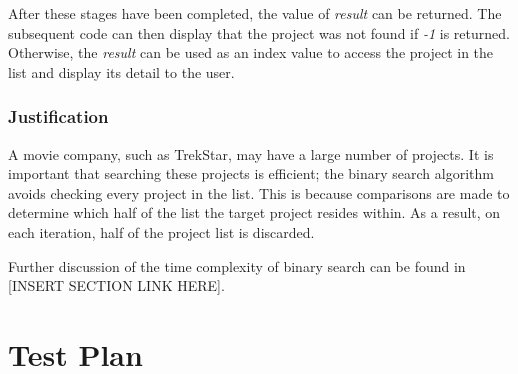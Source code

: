\documentclass[
  english,
  a4paper,
,tablecaptionabove
]{scrartcl}
\begin{document}
After these stages have been completed, the value of \emph{result} can
be returned. The subsequent code can then display that the project was
not found if \emph{-1} is returned. Otherwise, the \emph{result} can be
used as an index value to access the project in the list and display its
detail to the user.

\hypertarget{justification-1}{%
\subsubsection{Justification}\label{justification-1}}

A movie company, such as TrekStar, may have a large number of projects.
It is important that searching these projects is efficient; the binary
search algorithm avoids checking every project in the list. This is
because comparisons are made to determine which half of the list the
target project resides within. As a result, on each iteration, half of
the project list is discarded.

Further discussion of the time complexity of binary search can be found
in {[}INSERT SECTION LINK HERE{]}.

\newpage

\hypertarget{test-plan}{%
\section{Test Plan}\label{test-plan}}
\end{document}
